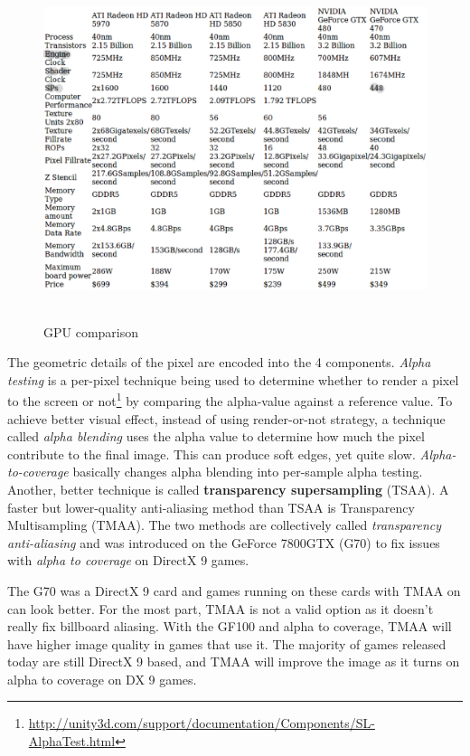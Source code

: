 \begin{figure}[hbt]
  \centerline{\includegraphics[height=10cm,
    angle=0]{./images/gpu_compare.eps}}
  \caption{GPU comparison}
  \label{fig:GPU_compare}
\end{figure}

The geometric details of the pixel are encoded into the 4
components. {\it Alpha testing} is a per-pixel technique being used to
determine whether to render a pixel to the screen or
not\footnote{\url{http://unity3d.com/support/documentation/Components/SL-AlphaTest.html}}
by comparing the alpha-value against a reference value. To achieve
better visual effect, instead of using render-or-not strategy, a
technique called {\it alpha blending} uses the alpha value to
determine how much the pixel contribute to the final image.  This can
produce soft edges, yet quite slow. {\it Alpha-to-coverage} basically
changes alpha blending into per-sample alpha testing. Another, better
technique is called {\bf transparency supersampling} (TSAA). A faster
but lower-quality anti-aliasing method than TSAA is Transparency
Multisampling (TMAA). The two methods are collectively called
{\it transparency anti-aliasing} and was introduced on the GeForce
7800GTX (G70) to fix issues with {\it alpha to coverage} on DirectX 9
games.

\begin{framed}
  The G70 was a DirectX 9 card and games running on these cards with
  TMAA on can look better. For the most part, TMAA is not a valid
  option as it doesn't really fix billboard aliasing. With the GF100
  and alpha to coverage, TMAA will have higher image quality in games
  that use it. The majority of games released today are still DirectX
  9 based, and TMAA will improve the image as it turns on alpha to
  coverage on DX 9 games.
\end{framed}


